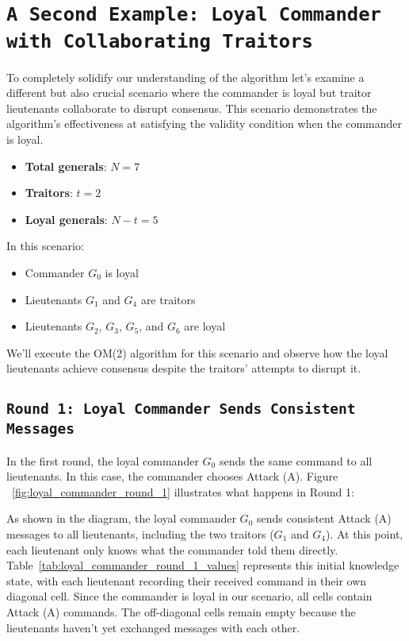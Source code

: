 \documentclass[11pt]{article}
\newcommand{\gen}[1]{\ensuremath{G_{#1}}}
\begin{document}
\section*{\texttt{\Large A Second Example: Loyal Commander with Collaborating Traitors}}

\justifying
To completely solidify our understanding of the algorithm let's examine a different but also  crucial scenario where the commander is loyal but traitor lieutenants collaborate to disrupt consensus. This scenario demonstrates the algorithm's effectiveness at satisfying the validity condition when the commander is loyal.

\begin{itemize}
    \item \textbf{Total generals}: $N = 7$
    \item \textbf{Traitors}: $t = 2$
    \item \textbf{Loyal generals}: $N - t = 5$
\end{itemize}

In this scenario:
\begin{itemize}
    \item Commander $\gen{0}$ is loyal
    \item Lieutenants $\gen{1}$ and $\gen{4}$ are traitors
    \item Lieutenants $\gen{2}$, $\gen{3}$, $\gen{5}$, and $\gen{6}$ are loyal
\end{itemize}

We'll execute the OM(2) algorithm for this scenario and observe how the loyal lieutenants achieve consensus despite the traitors' attempts to disrupt it.

\subsection*{\texttt{\large Round 1: Loyal Commander Sends Consistent Messages}}
\justifying
In the first round, the loyal commander $\gen{0}$ sends the same command to all lieutenants. In this case, the commander chooses Attack (A). Figure ~\ref{fig:loyal_commander_round_1} illustrates what happens in Round 1:



\justifying
As shown in the diagram, the loyal commander $\gen{0}$ sends consistent Attack (A) messages to all lieutenants, including the two traitors ($\gen{1}$ and $\gen{4}$).
At this point, each lieutenant only knows what the commander told them directly. Table~\ref{tab:loyal_commander_round_1_values} represents this initial knowledge state, with each lieutenant recording their received command in their own diagonal cell. Since the commander is loyal in our scenario, all cells contain Attack (A) commands. The off-diagonal cells remain empty because the lieutenants haven't yet exchanged messages with each other.
\end{document}
